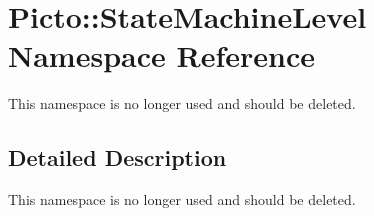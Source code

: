 \hypertarget{namespace_picto_1_1_state_machine_level}{\section{Picto\-:\-:State\-Machine\-Level Namespace Reference}
\label{namespace_picto_1_1_state_machine_level}
}


This namespace is no longer used and should be deleted.  




\subsection{Detailed Description}
This namespace is no longer used and should be deleted. 